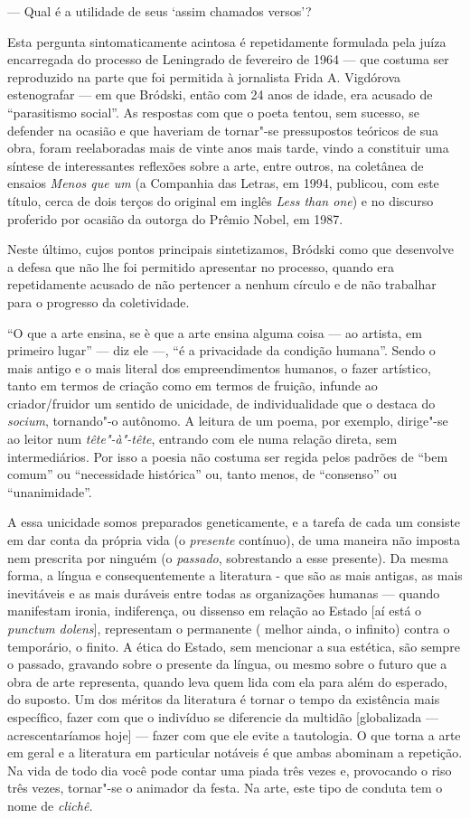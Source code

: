 --- Qual é a utilidade de seus `assim chamados versos'?

Esta pergunta sintomaticamente acintosa é repetidamente formulada pela
juíza encarregada do processo de Leningrado de fevereiro de 1964 ---
que costuma ser reproduzido na parte que foi permitida à jornalista Frida A.
Vigdórova estenografar --- em que Bródski, então com 24 anos de idade,
era acusado de ``parasitismo social''. As respostas com que o poeta
tentou, sem sucesso, se defender na ocasião e que haveriam de tornar"-se
pressupostos teóricos de sua obra, foram reelaboradas mais de vinte anos
mais tarde, vindo a constituir uma síntese de interessantes reflexões
sobre a arte, entre outros, na coletânea de ensaios \emph{Menos que um}
(a Companhia das Letras, em 1994, publicou, com este título, cerca de
dois terços do original em inglês \emph{Less than one}) e no
discurso proferido por ocasião da outorga do Prêmio Nobel, em 1987.

Neste último, cujos pontos principais sintetizamos, Bródski como que
desenvolve a defesa que não lhe foi permitido apresentar no processo,
quando era repetidamente acusado de não pertencer a nenhum círculo e de
não trabalhar para o progresso da coletividade.

``O que a arte ensina, se è que a arte ensina alguma coisa --- ao
artista, em primeiro lugar'' --- diz ele ---, ``é a privacidade da
condição humana''. Sendo o mais antigo e o mais literal dos
empreendimentos humanos, o fazer artístico, tanto em termos de criação
como em termos de fruição, infunde ao criador/fruidor um sentido de
unicidade, de individualidade que o destaca do \emph{socium}, tornando"-o
autônomo. A leitura de um poema, por exemplo, dirige"-se ao leitor num
\emph{tête"-à"-tête}, entrando com ele numa relação direta, sem
intermediários. Por isso a poesia não costuma ser regida pelos padrões
de ``bem comum'' ou ``necessidade histórica'' ou, tanto menos, de
``consenso'' ou ``unanimidade''.

A essa unicidade somos preparados geneticamente, e a tarefa de cada um
consiste em dar conta da própria vida (o \emph{presente} contínuo), de
uma maneira não imposta nem prescrita por ninguém (o \emph{passado},
sobrestando a esse presente). Da mesma forma, a língua e
consequentemente a literatura - que são as mais antigas, as mais
inevitáveis e as mais duráveis entre todas as organizações humanas ---
quando manifestam ironia, indiferença, ou dissenso em relação ao Estado
[aí está o \emph{punctum dolens}], representam o permanente (
melhor ainda, o infinito) contra o temporário, o finito. A ética do
Estado, sem mencionar a sua estética, são sempre o passado, gravando
sobre o presente da língua, ou mesmo sobre o futuro que a obra de arte
representa, quando leva quem lida com ela para além do esperado, do
suposto. Um dos méritos da literatura é tornar o tempo da existência
mais específico, fazer com que o indivíduo se diferencie da multidão
{[}globalizada --- acrescentaríamos hoje{]} --- fazer com que ele evite a
tautologia. O que torna a arte em geral e a literatura em particular
notáveis é que ambas abominam a repetição. Na vida de todo dia você pode
contar uma piada três vezes e, provocando o riso três vezes, tornar"-se o
animador da festa. Na arte, este tipo de conduta tem o nome de
\emph{clichê.}

